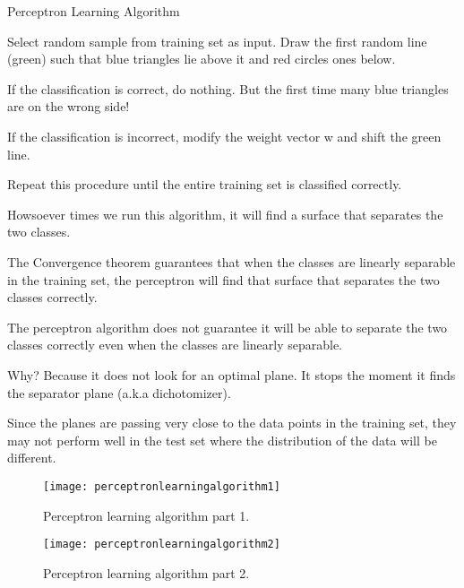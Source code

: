 Perceptron Learning Algorithm
	\begin{numberedlist}
		\item Select random sample from training set as input. Draw the first random line (green) such that blue triangles lie above it and red circles ones below.
		\item If the classification is correct, do nothing. But the first time many blue triangles are on the wrong side!
		\item If the classification is incorrect, modify the weight vector w and shift the green line.
		\item Repeat this procedure until the entire training set is classified correctly.
		\item Howsoever times we run this algorithm, it will find a surface that separates the two classes.
		\item The Convergence theorem guarantees that when the classes are linearly separable in the training set, the perceptron will find that surface that separates the two classes correctly.
		\item The perceptron algorithm does not guarantee it will be able to separate the two classes correctly even when the classes are linearly separable.
		\item Why? Because it does not look for an optimal plane. It stops the moment it finds the separator plane (a.k.a dichotomizer).
		\item Since the planes are passing very close to the data points in the training set, they may not perform well in the test set where the distribution of the data will be different.
	\end{numberedlist}

 	\begin{figure}[htb]
		\centering
		\texttt{[image: perceptronlearningalgorithm1]}
		\caption[Perceptron learning algorithm part 1]{Perceptron learning algorithm part 1.}
		\label{fig:perceptronlearningalgorithm1}
	\end{figure}
 	\begin{figure}[htb]
		\centering
		\texttt{[image: perceptronlearningalgorithm2]}
		\caption[Perceptron learning algorithm part 2]{Perceptron learning algorithm part 2.}
		\label{fig:perceptronlearningalgorithm2}
	\end{figure}

